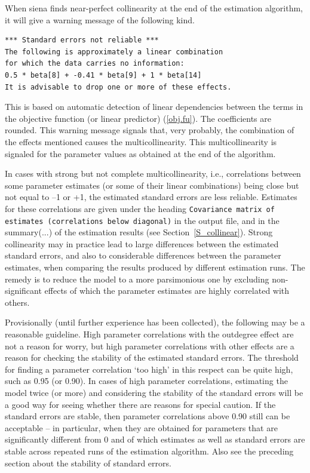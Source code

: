 \documentclass[a4paper,fleqn,11pt]{article}
\newcommand{\+}{\, + \,}
\begin{document}
When \textsf{siena} finds near-perfect collinearity at the end of the
estimation algorithm, it will give a warning message of the following kind.

\begin{verbatim}
*** Standard errors not reliable ***
The following is approximately a linear combination
for which the data carries no information:
0.5 * beta[8] + -0.41 * beta[9] + 1 * beta[14]
It is advisable to drop one or more of these effects.
\end{verbatim}

\noindent
This is based on automatic detection of linear dependencies
between the terms in the objective function (or linear predictor)
(\ref{obj.fu}). The coefficients are rounded.
This warning message signals that, very probably,
the combination of the effects mentioned causes the multicollinearity.
This multicollinearity is signaled for the parameter values as
obtained at the end of the algorithm.
\bigskip


In cases with strong but not complete multicollinearity,
i.e., correlations between some parameter estimates
(or some of their linear combinations) being close but not equal to --1 or +1,
the estimated standard errors are less reliable.
 Estimates for these correlations
are given under the heading
\texttt{Covariance matrix of estimates (correlations below diagonal)}
in the output file, and in the \textsf{summary(...)} of the estimation results
(see Section~\ref{S_collinear}).
Strong collinearity may in practice lead to large differences
between the estimated standard errors,
and also to considerable differences between the parameter estimates,
when comparing the results produced by different estimation runs.
The remedy is to reduce the model to a more parsimonious one
by excluding non-significant effects of which the parameter
estimates are highly correlated with others.

Provisionally (until further experience has been collected),
the following may be a reasonable guideline.
High parameter correlations with the outdegree effect are not a
reason for worry, but high parameter correlations with other effects are
a reason for checking the stability of the estimated standard errors. The
threshold for finding a parameter correlation `too high' in this respect
can be quite high, such as 0.95 (or 0.90).
In cases of high parameter correlations, estimating the model twice
(or more) and considering the stability of the standard errors will be
a good way for seeing whether there are reasons for special caution.
If the standard errors are stable, then parameter correlations above
0.90 still can be acceptable -- in particular, when they are obtained
for parameters that are significantly different from 0 and of which
estimates as well as standard errors are stable across repeated runs of
the estimation algorithm.
Also see the preceding section about the stability of standard errors.
\end{document}
